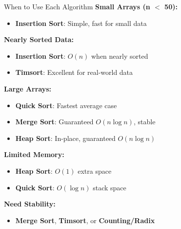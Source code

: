 \documentclass[aspectratio=169]{beamer}
\begin{document}
\begin{frame}{When to Use Each Algorithm}
  \textbf{Small Arrays (n $<$ 50):}
  \begin{itemize}
    \item \textbf{Insertion Sort}: Simple, fast for small data
  \end{itemize}

  \vspace{0.2cm}
  \textbf{Nearly Sorted Data:}
  \begin{itemize}
    \item \textbf{Insertion Sort}: $O(n)$ when nearly sorted
    \item \textbf{Timsort}: Excellent for real-world data
  \end{itemize}

  \vspace{0.2cm}
  \textbf{Large Arrays:}
  \begin{itemize}
    \item \textbf{Quick Sort}: Fastest average case
    \item \textbf{Merge Sort}: Guaranteed $O(n \log n)$, stable
    \item \textbf{Heap Sort}: In-place, guaranteed $O(n \log n)$
  \end{itemize}

  \vspace{0.2cm}
  \textbf{Limited Memory:}
  \begin{itemize}
    \item \textbf{Heap Sort}: $O(1)$ extra space
    \item \textbf{Quick Sort}: $O(\log n)$ stack space
  \end{itemize}

  \vspace{0.2cm}
  \textbf{Need Stability:}
  \begin{itemize}
    \item \textbf{Merge Sort}, \textbf{Timsort}, or \textbf{Counting/Radix}
  \end{itemize}
\end{frame}
\end{document}
